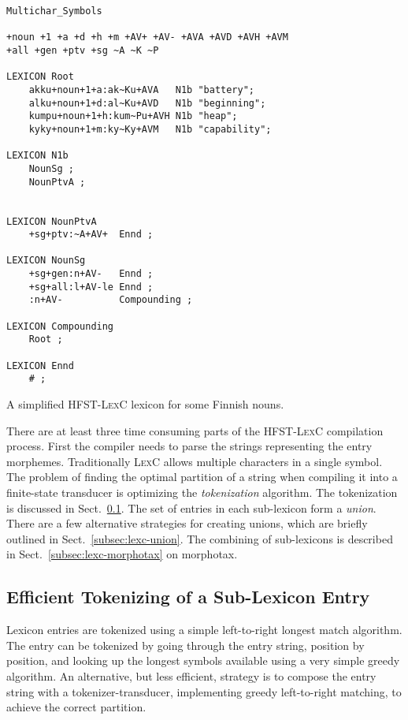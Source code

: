 \documentclass[a4paper]{article}
\begin{document}
\begin{table}[!h]
\begin{verbatim}
Multichar_Symbols

+noun +1 +a +d +h +m +AV+ +AV- +AVA +AVD +AVH +AVM 
+all +gen +ptv +sg ~A ~K ~P 

LEXICON Root
    akku+noun+1+a:ak~Ku+AVA   N1b "battery";
    alku+noun+1+d:al~Ku+AVD   N1b "beginning";
    kumpu+noun+1+h:kum~Pu+AVH N1b "heap";
    kyky+noun+1+m:ky~Ky+AVM   N1b "capability";

LEXICON N1b
    NounSg ;
    NounPtvA ;


LEXICON NounPtvA
    +sg+ptv:~A+AV+  Ennd ;

LEXICON NounSg
    +sg+gen:n+AV-   Ennd ;
    +sg+all:l+AV-le Ennd ;
    :n+AV-          Compounding ;

LEXICON Compounding
    Root ;

LEXICON Ennd
    # ;
\end{verbatim}
\caption{A simplified \textsc{HFST-LexC} lexicon for some Finnish
nouns.}\label{fig:finnish-lexc}
\end{table}

There are at least three time consuming parts of the \textsc{HFST-LexC} compilation
process.  First the compiler needs to parse the strings representing
the entry morphemes. Traditionally \textsc{LexC} allows multiple
characters in a single symbol. The problem of finding the optimal
partition of a string when compiling it into a finite-state transducer
is optimizing the \emph{tokenization} algorithm. The tokenization is
discussed in Sect.~\ref{subsec:lexc-tokenisation}.  The set of entries
in each sub-lexicon form a \emph{union}. There are a few alternative
strategies for creating unions, which are briefly outlined in
Sect.~\ref{subsec:lexc-union}. The combining of sub-lexicons is
described in Sect.~\ref{subsec:lexc-morphotax} on morphotax.

\subsection{Efficient Tokenizing of a Sub-Lexicon Entry}
\label{subsec:lexc-tokenisation}

Lexicon entries are tokenized using a simple left-to-right longest
match algorithm. The entry can be tokenized by going through the entry
string, position by position, and looking up the longest symbols
available using a very simple greedy algorithm. An alternative, but
less efficient, strategy is to compose the entry string with a
tokenizer-transducer, implementing greedy left-to-right matching, to
achieve the correct partition.
\end{document}
